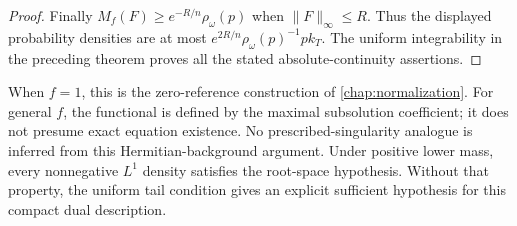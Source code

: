 \begin{proof}
Finally $M_f(F)\geq e^{-R/n}\rho_\omega(p)$ when $\|F\|_\infty\leq R$. Thus the displayed probability densities are at most $e^{2R/n}\rho_\omega(p)^{-1}p k_T$. The uniform integrability in the preceding theorem proves all the stated absolute-continuity assertions.
\end{proof}

When $f=1$, this is the zero-reference construction of \cref{chap:normalization}. For general $f$, the functional is defined by the maximal subsolution coefficient; it does not presume exact equation existence. No prescribed-singularity analogue is inferred from this Hermitian-background argument. Under positive lower mass, every nonnegative $L^1$ density satisfies the root-space hypothesis. Without that property, the uniform tail condition gives an explicit sufficient hypothesis for this compact dual description.
